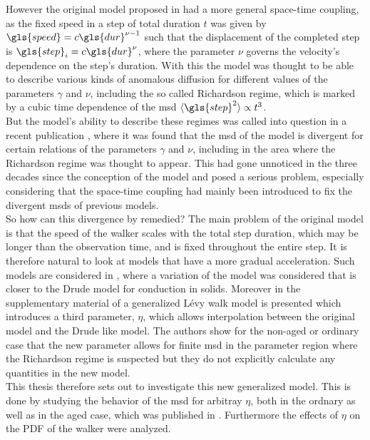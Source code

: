 However the original model proposed in \cite{shlesinger1987} had a more general space-time coupling, as the fixed speed in a step of total duration $t$ was given by $\gls{speed} = c  \gls{dur}^{\nu-1}$ such that the displacement of the completed step is $\gls{step}_i = c \gls{dur}^{\nu}$, where the parameter $\nu$ governs the velocity's dependence on the step's duration. With this the model was thought to be able to describe various kinds of anomalous diffusion for different values of the parameters $\gamma$ and $\nu$, including the so called Richardson regime, which is marked by a cubic time dependence of the \gls{msd} $\mean{\gls{step}^2} \propto t^3$. \\

But the model's ability to describe these regimes was called into question in a recent publication \cite{radons2018}, where it was found that the \gls{msd} of the model is divergent for certain relations of the parameters $\gamma$ and $\nu$, including in the area where the Richardson regime was thought to appear. This had gone unnoticed in the three decades since the conception of the model and posed a serious problem, especially considering that the space-time coupling had mainly been introduced to fix the divergent \gls{msd}s of previous models. \\

So how can this divergence by remedied? The main problem of the original model is that the speed of the walker scales with the total step duration, which may be longer than the observation time, and is fixed throughout the entire step. It is therefore natural to look at models that have a more gradual acceleration. Such models are considered in \cite{BarkaiKlafterBuch,schulz1997}, where a variation of the model was considered that is closer to the Drude model for conduction in solids.
Moreover in the supplementary material of \cite{radons2018} a generalized L\'evy walk model is presented which introduces a third parameter, $\eta$, which allows interpolation between the original model and the Drude like model. The authors show for the non-aged or ordinary case that the new parameter allows for finite \gls{msd} in the parameter region where the Richardson regime is suspected but they do not explicitly calculate any quantities in the new model.\\ 
  
This thesis therefore sets out to investigate this new generalized model. This is done by studying the behavior of the \gls{msd} for arbitray $\eta$, both in the ordnary as well as in the aged case, which was published in \cite{bothe}. Furthermore the effects of $\eta$ on the \gls{PDF} of the walker were analyzed.




